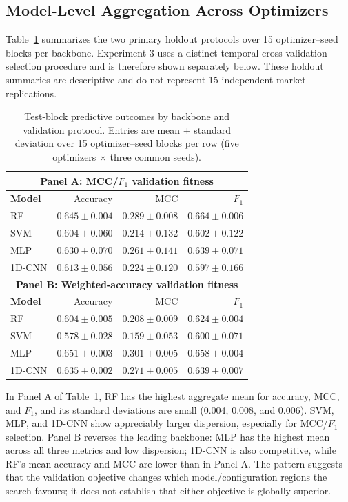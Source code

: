 \subsection{Model-Level Aggregation Across Optimizers}
Table~\ref{tab:predictive_summary} summarizes the two primary holdout protocols over 15 optimizer--seed blocks per backbone. Experiment 3 uses a distinct temporal cross-validation selection procedure and is therefore shown separately below. These holdout summaries are descriptive and do not represent 15 independent market replications.

\begin{table}[!htbp]
\centering
\caption{Test-block predictive outcomes by backbone and validation protocol. Entries are mean $\pm$ standard deviation over 15 optimizer--seed blocks per row (five optimizers $\times$ three common seeds).}
\label{tab:predictive_summary}
\manuscripttablestyle
\begin{tabular}{lrrr}\toprule
\multicolumn{4}{c}{\textbf{Panel A: MCC/$F_1$ validation fitness}}\\\midrule
\textbf{Model} & Accuracy & MCC & $F_1$\\\midrule
RF & $0.645\pm0.004$ & $0.289\pm0.008$ & $0.664\pm0.006$\\
SVM & $0.604\pm0.060$ & $0.214\pm0.132$ & $0.602\pm0.122$\\
MLP & $0.630\pm0.070$ & $0.261\pm0.141$ & $0.639\pm0.071$\\
1D-CNN & $0.613\pm0.056$ & $0.224\pm0.120$ & $0.597\pm0.166$\\\midrule
\multicolumn{4}{c}{\textbf{Panel B: Weighted-accuracy validation fitness}}\\\midrule
\textbf{Model} & Accuracy & MCC & $F_1$\\\midrule
RF & $0.604\pm0.005$ & $0.208\pm0.009$ & $0.624\pm0.004$\\
SVM & $0.578\pm0.028$ & $0.159\pm0.053$ & $0.600\pm0.071$\\
MLP & $0.651\pm0.003$ & $0.301\pm0.005$ & $0.658\pm0.004$\\
1D-CNN & $0.635\pm0.002$ & $0.271\pm0.005$ & $0.639\pm0.007$\\\bottomrule
\end{tabular}
\end{table}

In Panel A of Table~\ref{tab:predictive_summary}, RF has the highest aggregate mean for accuracy, MCC, and $F_1$, and its standard deviations are small (0.004, 0.008, and 0.006). SVM, MLP, and 1D-CNN show appreciably larger dispersion, especially for MCC/$F_1$ selection. Panel B reverses the leading backbone: MLP has the highest mean across all three metrics and low dispersion; 1D-CNN is also competitive, while RF's mean accuracy and MCC are lower than in Panel A. The pattern suggests that the validation objective changes which model/configuration regions the search favours; it does not establish that either objective is globally superior.



